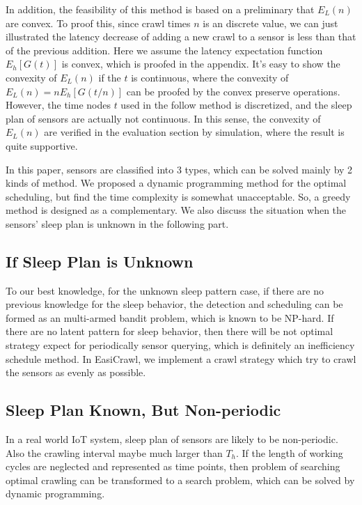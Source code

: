 \documentclass[conference]{IEEEtran}
\begin{document}
In addition, the feasibility of this method is based on a preliminary that $E_L(n)$ are convex. 
To proof this, since crawl times $n$ is an discrete value, we can just illustrated the latency decrease of adding a new crawl to a sensor is less than that of the previous addition.
Here we assume the latency expectation function $E_h[G(t)]$ is convex, which is proofed in the appendix. It's easy to show the convexity of $E_L(n)$ if the $t$ is continuous, where the convexity of $E_L(n) = n E_h[G(t/n)]$ can be proofed by the convex preserve operations. However, the time nodes $t$ used in the follow method is discretized, and the sleep plan of sensors are actually not continuous. In this sense, the convexity of $E_L(n)$ are verified in the evaluation section by simulation, where the result is quite supportive.

In this paper, sensors are classified into 3 types, which can be solved mainly by 2 kinds of method. We proposed a dynamic programming method for the optimal scheduling, but find the time complexity is somewhat unacceptable. So, a greedy method is designed as a complementary. We also discuss the situation when the sensors' sleep plan is unknown in the following part.

\subsection{If Sleep Plan is Unknown}
To our best knowledge, for the unknown sleep pattern case, if there are no previous knowledge for the sleep behavior, the detection and scheduling can be formed as an multi-armed bandit problem, which is known to be NP-hard. If there are no latent pattern for sleep behavior, then there will be not optimal strategy expect for periodically sensor querying, which is definitely an inefficiency schedule method. In EasiCrawl, we implement a crawl strategy which try to crawl the sensors as evenly as possible.


\subsection{Sleep Plan Known, But Non-periodic}
In a real world IoT system, sleep plan of sensors are likely to be non-periodic. Also the crawling interval maybe much larger than $T_h$. 
If the length of working cycles are neglected and represented as time points, then problem of searching optimal crawling can be transformed to a search problem, which can be solved by dynamic programming.
\end{document}
